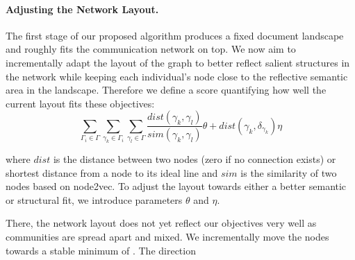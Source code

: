 \paragraph{Adjusting the Network Layout.}
The first stage of our proposed algorithm produces a fixed document landscape and roughly fits the communication network on top. 
We now aim to incrementally adapt the layout of the graph to better reflect salient structures in the network while keeping each individual's node close to the reflective semantic area in the landscape.
Therefore we define a score quantifying how well the current layout fits these objectives:
\begin{equation}
\sum_{\Gamma_i\in\Gamma}\sum_{\gamma_k\in\Gamma_i}\sum_{\gamma_l\in\Gamma}
\frac{dist(\gamma_k,\gamma_l)}{sim(\gamma_k,\gamma_l)}\theta+dist(\gamma_k, \delta_{\gamma_k})\eta
\label{eq:score}
\end{equation}

where $dist$ is the distance between two nodes (zero if no connection exists) or shortest distance from a node to its ideal line and $sim$ is the similarity of two nodes based on node2vec.
To adjust the layout towards either a better semantic or structural fit, we introduce parameters $\theta$ and $\eta$.


There, the network layout does not yet reflect our objectives very well as communities are spread apart and mixed.
We incrementally move the nodes towards a stable minimum of .
The direction 

